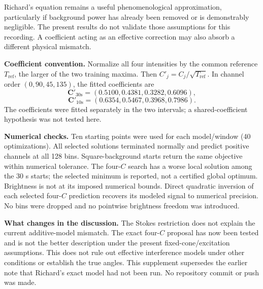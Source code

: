 \documentclass[11pt,a4paper]{article}
\begin{document}
Richard's equation remains a useful phenomenological approximation, particularly if background power has already been removed or is demonstrably negligible. The present results do not validate those assumptions for this recording. A coefficient acting as an effective correction may also absorb a different physical mismatch.

\textbf{Coefficient convention.} Normalize all four intensities by the common reference $T_{\mathrm{ref}}$, the larger of the two training maxima. Then $C'_j=C_j/\sqrt{T_{\mathrm{ref}}}$. In channel order $(0,90,45,135)$, the fitted coefficients are
\[
\mathbf C'_{30\mathrm{s}}=(0.5100,0.4381,0.3282,0.6096),
\]
\[
\mathbf C'_{10\mathrm{s}}=(0.6354,0.5467,0.3968,0.7986).
\]
The coefficients were fitted separately in the two intervals; a shared-coefficient hypothesis was not tested here.

\textbf{Numerical checks.} Ten starting points were used for each model/window (40 optimizations). All selected solutions terminated normally and predict positive channels at all 128 bins. Square-background starts return the same objective within numerical tolerance. The four-$C$ search has a worse local solution among the 30 s starts; the selected minimum is reported, not a certified global optimum. Brightness is not at its imposed numerical bounds. Direct quadratic inversion of each selected four-$C$ prediction recovers its modeled signal to numerical precision. No bins were dropped and no pointwise brightness freedom was introduced.

\textbf{What changes in the discussion.} The Stokes restriction does not explain the current additive-model mismatch. The exact four-$C$ proposal has now been tested and is not the better description under the present fixed-cone/excitation assumptions. This does not rule out effective interference models under other conditions or establish the true angles. This supplement supersedes the earlier note that Richard's exact model had not been run. No repository commit or push was made.
\end{document}
